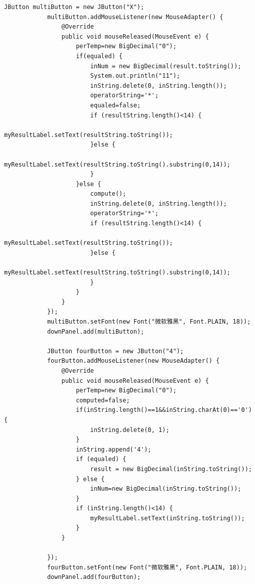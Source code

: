 \documentclass{ctexart}
\begin{document}
\begin{lstlisting}[caption=冗杂的代码]
            JButton multiButton = new JButton("X");
            multiButton.addMouseListener(new MouseAdapter() {
                @Override
                public void mouseReleased(MouseEvent e) {
                    perTemp=new BigDecimal("0");
                    if(equaled) {
                        inNum = new BigDecimal(result.toString());
                        System.out.println("11");
                        inString.delete(0, inString.length());
                        operatorString='*';
                        equaled=false;
                        if (resultString.length()<14) {
                            myResultLabel.setText(resultString.toString());
                        }else {
                            myResultLabel.setText(resultString.toString().substring(0,14));
                        }
                    }else {
                        compute();
                        inString.delete(0, inString.length());
                        operatorString='*';
                        if (resultString.length()<14) {
                            myResultLabel.setText(resultString.toString());
                        }else {
                            myResultLabel.setText(resultString.toString().substring(0,14));
                        }
                    }
                }
            });
            multiButton.setFont(new Font("微软雅黑", Font.PLAIN, 18));
            downPanel.add(multiButton);
            
            JButton fourButton = new JButton("4");
            fourButton.addMouseListener(new MouseAdapter() {
                @Override
                public void mouseReleased(MouseEvent e) {
                    perTemp=new BigDecimal("0");
                    computed=false;
                    if(inString.length()==1&&inString.charAt(0)=='0') {
                        inString.delete(0, 1);
                    }
                    inString.append('4');
                    if (equaled) {
                        result = new BigDecimal(inString.toString());		
                    } else {
                        inNum=new BigDecimal(inString.toString());
                    }
                    if (inString.length()<14) {
                        myResultLabel.setText(inString.toString());
                    }
                }
            
            });
            fourButton.setFont(new Font("微软雅黑", Font.PLAIN, 18));
            downPanel.add(fourButton);
            

\end{lstlisting}
\end{document}
